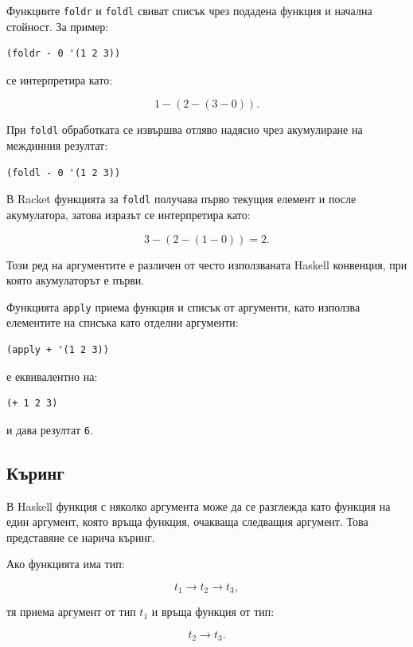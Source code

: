 Функциите \texttt{foldr} и \texttt{foldl} свиват списък чрез подадена функция и начална стойност. За пример:

\begin{verbatim}
(foldr - 0 '(1 2 3))
\end{verbatim}

се интерпретира като:

\[
1-(2-(3-0)).
\]

При \texttt{foldl} обработката се извършва отляво надясно чрез акумулиране на междинния резултат:

\begin{verbatim}
(foldl - 0 '(1 2 3))
\end{verbatim}

В Racket функцията за \texttt{foldl} получава първо текущия елемент и после акумулатора, затова изразът се интерпретира като:

\[
3-(2-(1-0))=2.
\]

Този ред на аргументите е различен от често използваната Haskell конвенция, при която акумулаторът е първи.

Функцията \texttt{apply} приема функция и списък от аргументи, като използва елементите на списъка като отделни аргументи:

\begin{verbatim}
(apply + '(1 2 3))
\end{verbatim}

е еквивалентно на:

\begin{verbatim}
(+ 1 2 3)
\end{verbatim}

и дава резултат \texttt{6}.

\subsection{Къринг}\label{s:19.4.2}

\begin{defn}[Къринг]
В Haskell функция с няколко аргумента може да се разглежда като функция на един аргумент, която връща функция, очакваща следващия аргумент. Това представяне се нарича къринг.
\end{defn}

Ако функцията има тип:

\[
t_1\to t_2\to t_3,
\]

тя приема аргумент от тип $t_1$ и връща функция от тип:

\[
t_2\to t_3.
\]

